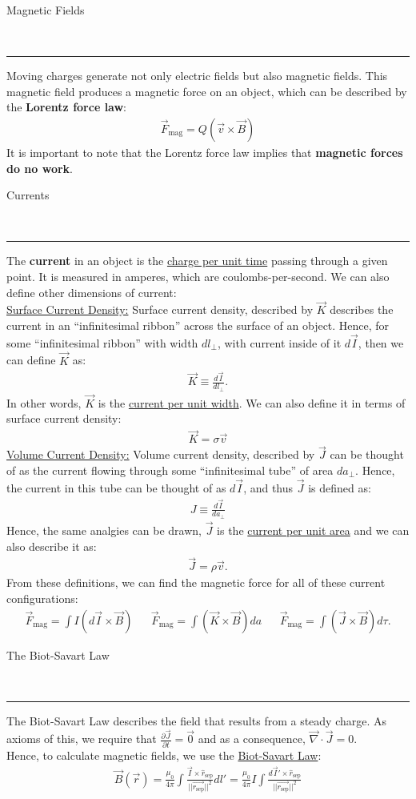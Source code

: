 \documentclass{article}
\newcommand{\sepvec}{\vec{r_\textrm{sep}}}
\newcommand{\header}[1]{\begin{large}\noindent #1\end{large}\\\rule{\textwidth}{0.5pt}}
\newcommand{\gap}{\medskip\\}
\newcommand{\sheader}[1]{\underline{#1:}}
\begin{document}
\header{Magnetic Fields}
Moving charges generate not only electric fields but also magnetic fields.
This magnetic field produces a magnetic force on an object, which can be
described by the \textbf{Lorentz force law}:
\begin{align*}
    \vec{F}_\textrm{mag} = Q(\vec{v} \times \vec{B})
\end{align*}
It is important to note that the Lorentz force law implies that 
\textbf{magnetic forces do no work}.
\gap
\header{Currents}
The \textbf{current} in an object is the \underline{charge per unit time}
passing through a given point. It is measured in amperes, which are coulombs-per-second.
We can also define other dimensions of current:
\gap
\sheader{Surface Current Density} Surface current density, described by $\vec{K}$
describes the current in an ``infinitesimal ribbon'' across the surface
of an object. Hence, for some ``infinitesimal ribbon'' with width $dl_\perp$,
with current inside of it $d\vec{I}$, then we can define $\vec{K}$ as:
\begin{align*}
    \vec{K} \equiv \frac{d\vec{I}}{dl_\perp}.
\end{align*}
In other words, $\vec{K}$ is the \underline{current per unit width}. We 
can also define it in terms of surface current density:
\begin{align*}
    \vec{K} = \sigma \vec{v}
\end{align*}
\sheader{Volume Current Density} Volume current density, described by $\vec{J}$
can be thought of as the current flowing through some ``infinitesimal tube'' 
of area $da_\perp$. Hence, the current in this tube can be thought of as 
$d\vec{I}$, and thus $\vec{J}$ is defined as:
\begin{align*}
    J \equiv \frac{d\vec{I}}{da_\perp}
\end{align*}
Hence, the same analgies can be drawn, $\vec{J}$ is the \underline{current per unit area}
and we can also describe it as:
\begin{align*}
    \vec{J} = \rho\vec{v}.
\end{align*}
From these definitions, we can find the magnetic force for all of these current
configurations:
\begin{align*}
    \vec{F}_\textrm{mag} = \int I(d\vec{I} \times \vec{B}) &&
    \vec{F}_\textrm{mag} = \int (\vec{K} \times \vec{B})da &&
    \vec{F}_\textrm{mag} = \int (\vec{J} \times \vec{B}) d\tau.
\end{align*}

\pagebreak
\header{The Biot-Savart Law}
The Biot-Savart Law describes the field that results from a steady charge.
As axioms of this, we require that $\frac{\partial \vec{J}}{\partial t} = \vec{0}$
and as a consequence, $\vec{\nabla} \cdot \vec{J} = 0$.
\gap
Hence, to calculate magnetic fields, we use the \underline{Biot-Savart Law}:
\begin{align*}
    \vec{B}(\vec{r}) = \frac{\mu_0}{4\pi} \int \frac{\vec{I} \times \hat{r}_\textrm{sep}}{||\sepvec||^2} dl' = 
    \frac{\mu_0}{4\pi}I \int \frac{d\vec{I}'\times \hat{r}_\textrm{sep}}{||\sepvec||^2}
\end{align*}
\end{document}
